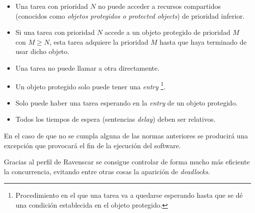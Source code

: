 \begin{itemize}
\item Una tarea con prioridad $N$ no puede acceder a recursos compartidos
  (conocidos como \textit{objetos protegidos o protected objects}) de prioridad
  inferior.
\item Si una tarea con prioridad $N$ accede a un objeto protegido
  de prioridad $M$
  con $M \geq N$, esta tarea adquiere la prioridad $M$ hasta que haya
  terminado de usar dicho objeto.
\item Una tarea no puede llamar a otra directamente.
\item Un objeto protegido solo puede tener una \textit{entry}
  \footnote{Procedimiento en el que una tarea va a quedarse esperando hasta que
  se dé una condición establecida en el objeto protegido.}.
\item Solo puede haber una tarea esperando en la \textit{entry} de un objeto
  protegido.
\item Todos los tiempos de espera (sentencias \textit{delay}) deben ser
  relativos.
\end{itemize}

En el caso de que no se cumpla alguna de las normas anteriores se producirá
una excepción que provocará el fin de la ejecución del software.

Gracias al perfil de Ravenscar se consigue controlar de forma mucho más
eficiente la concurrencia, evitando entre otras cosas
la aparición de \textit{deadlocks}.


